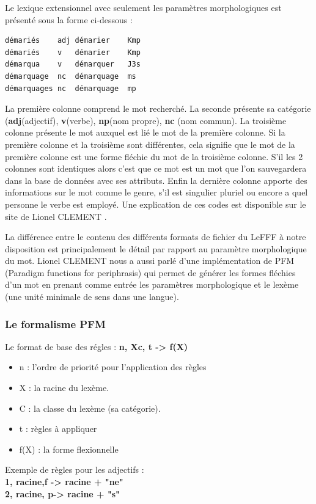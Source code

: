 \documentclass[12pt,a4paper]{article}
\begin{document}
Le lexique extensionnel avec seulement les paramètres morphologiques est présenté sous la forme ci-dessous :
\begin{verbatim}
démariés	adj	démarier	Kmp
démariés	v	démarier	Kmp
démarqua	v	démarquer	J3s
démarquage	nc	démarquage	ms
démarquages	nc	démarquage	mp
\end{verbatim}

\smallbreak La première colonne comprend le mot recherché. 
\smallbreak La seconde présente sa catégorie (\textbf{adj}(adjectif), \textbf{v}(verbe), \textbf{np}(nom propre), \textbf{nc} (nom commun).
\smallbreak La troisième colonne présente le mot auxquel est lié le mot de la première colonne.
Si la première colonne et la troisième sont différentes, cela signifie que le mot de la première colonne est une forme fléchie du mot de la troisième colonne. S'il les 2 colonnes sont identiques alors c'est que ce mot est un mot que l'on sauvegardera dans la base de données avec ses attributs.
Enfin la dernière colonne apporte des informations sur le mot comme le genre, s'il est singulier pluriel ou encore a quel personne le verbe est employé. Une explication de ces codes est disponible sur le site de Lionel CLEMENT \cite{tagset}.

La différence entre le contenu des différents formats de fichier du LeFFF à notre disposition est principalement le détail par rapport au paramètre morphologique du mot.
Lionel CLEMENT nous a aussi parlé d'une implémentation de PFM (Paradigm functions for periphrasis) qui permet de générer les formes fléchies d'un mot en prenant comme entrée les paramètres morphologique et le lexème (une unité minimale de sens dans une langue).
\subsubsection{Le formalisme PFM  }
      Le format de base des régles : \textbf{n, Xc, t -> f(X) } \\
\begin{itemize}
    \item n : l’ordre de priorité pour l’application des règles
    \item X : la racine du lexème.
    \item C : la classe du lexème (sa catégorie).
    \item t : règles à appliquer
    \item f(X) : la forme flexionnelle
\end{itemize}

Exemple de règles pour les adjectifs : \\
\textbf{1, racine,{f} -> racine + "ne"} \\
\textbf{2, racine, {p}-> racine + "s"}
\end{document}
